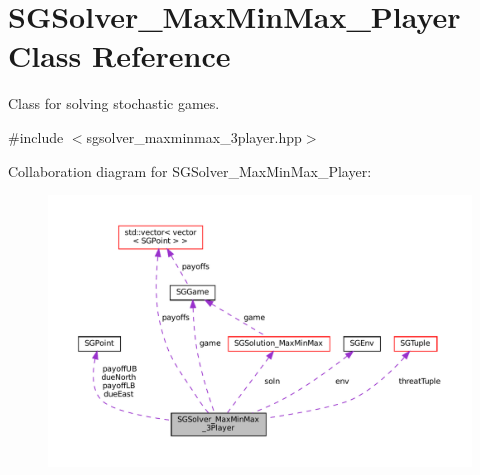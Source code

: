 \hypertarget{classSGSolver__MaxMinMax__3Player}{}\section{S\+G\+Solver\+\_\+\+Max\+Min\+Max\+\_\+Player Class Reference}
\label{classSGSolver__MaxMinMax__3Player}


Class for solving stochastic games.  




{\ttfamily \#include $<$sgsolver\+\_\+maxminmax\+\_\+3player.\+hpp$>$}



Collaboration diagram for S\+G\+Solver\+\_\+\+Max\+Min\+Max\+\_\+Player\+:
\nopagebreak
\begin{figure}[H]
\begin{center}
\leavevmode
\includegraphics[width=350pt]{classSGSolver__MaxMinMax__3Player__coll__graph}
\end{center}
\end{figure}
